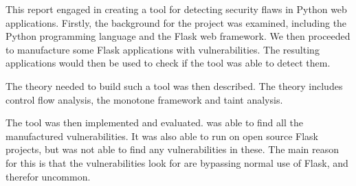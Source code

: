 This report engaged in creating a tool for detecting security flaws in Python web applications.
Firstly, the background for the project was examined, including the Python programming language and the Flask web framework.
We then proceeded to manufacture some Flask applications with vulnerabilities.
The resulting applications would then be used to check if the tool was able to detect them.

The theory needed to build such a tool was then described.
The theory includes control flow analysis, the monotone framework and taint analysis.

The tool \pyt{} was then implemented and evaluated.
\pyt{} was able to find all the manufactured vulnerabilities.
It was also able to run on open source Flask projects, but was not able to find any vulnerabilities in these.
The main reason for this is that the vulnerabilities \pyt{} look for are bypassing normal use of Flask, and therefor uncommon.

